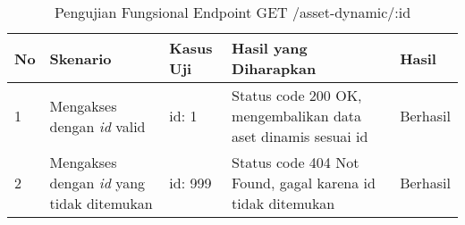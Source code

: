 \begin{table}[H]
    \centering
    \begin{tabular}{|p{0.5cm}|p{3cm}|p{5cm}|p{5cm}|p{1.5cm}|}
        \hline
        \rowcolor[HTML]{DAE8FC} 
        \textbf{No} & \textbf{Skenario} & \textbf{Kasus Uji} & \textbf{Hasil yang Diharapkan} & \textbf{Hasil} \\ \hline
        1 & Mengakses dengan \textit{id} valid & 
        id: 1 & 
        Status code 200 OK, mengembalikan data aset dinamis sesuai id & 
        Berhasil \\ \hline
        2 & Mengakses dengan \textit{id} yang tidak ditemukan & 
        id: 999 & 
        Status code 404 Not Found, gagal karena id tidak ditemukan & 
        Berhasil \\ \hline
    \end{tabular}
    \caption{Pengujian Fungsional Endpoint GET /asset-dynamic/:id}
    \label{tab:asset_dynamic_getone_testing}
\end{table}
